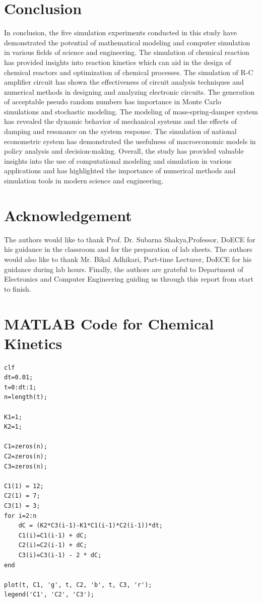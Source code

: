 \documentclass[10pt,journal,cspaper,compsoc]{IEEEtran}
\begin{document}
  \section{Conclusion}
  In conclusion, the five simulation experiments conducted in this study have demonstrated the potential of mathematical modeling and computer simulation in various fields of science and engineering. The simulation of chemical reaction has provided insights into reaction kinetics which can aid in the design of chemical reactors and optimization of chemical processes. The simulation of R-C amplifier circuit has shown the effectiveness of circuit analysis techniques and numerical methods in designing and analyzing electronic circuits. The generation of acceptable pseudo random numbers has importance in Monte Carlo simulations and stochastic modeling. The modeling of mass-spring-damper system has revealed the dynamic behavior of mechanical systems and the effects of damping and resonance on the system response. The simulation of national econometric system has demonstrated the usefulness of macroeconomic models in policy analysis and decision-making.  Overall, the study has provided valuable insights into the use of computational modeling and simulation in various applications and has highlighted the importance of numerical methods and simulation tools in modern science and engineering. 

  \section{Acknowledgement}
  The authors would like to thank Prof. Dr. Subarna Shakya,Professor, DoECE for his guidance in the classroom and for the preparation of lab sheets. 
  The authors would also like to thank Mr. Bikal Adhikari, Part-time Lecturer, DoECE for his guidance during lab hours.
  Finally, the authors are grateful to Department of Electronics and Computer Engineering guiding us through this report from start to finish.
  
  
  \renewcommand{\bibname}{References}
  
  

  \appendices
\section{MATLAB Code for Chemical Kinetics}
\begin{verbatim}
clf
dt=0.01;
t=0:dt:1;
n=length(t);

K1=1;
K2=1;

C1=zeros(n);
C2=zeros(n);
C3=zeros(n);

C1(1) = 12;
C2(1) = 7;
C3(1) = 3;
for i=2:n
    dC = (K2*C3(i-1)-K1*C1(i-1)*C2(i-1))*dt;
    C1(i)=C1(i-1) + dC;
    C2(i)=C2(i-1) + dC;
    C3(i)=C3(i-1) - 2 * dC;
end

plot(t, C1, 'g', t, C2, 'b', t, C3, 'r');
legend('C1', 'C2', 'C3');
\end{verbatim}
\end{document}
